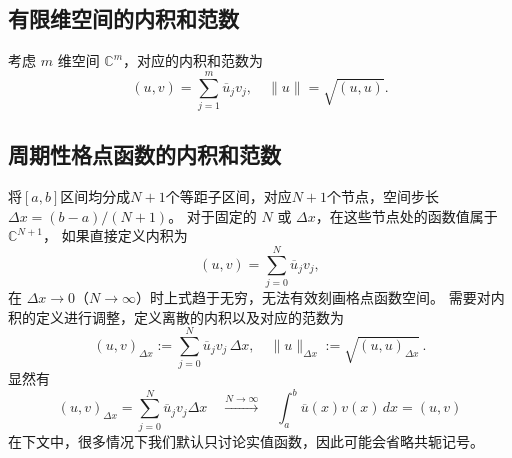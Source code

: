 \subsection*{有限维空间的内积和范数}

考虑 $m$ 维空间 $\mathbb{C}^m$，对应的内积和范数为
\[
    (u,v) = \sum_{j=1}^m \overline{u}_j v_j,\quad \|u\| = \sqrt{(u,u)}.
\]

\subsection*{周期性格点函数的内积和范数}

将$[a,b]$区间均分成$N+1$个等距子区间，对应$N+1$个节点，空间步长 $\Delta x = (b-a)/(N+1)$。
对于固定的 $N$ 或 $\Delta x$，在这些节点处的函数值属于 $\mathbb{C}^{N+1}$，
如果直接定义内积为
\[
    (u,v) = \sum_{j=0}^N \overline{u}_j v_j,
\]
在 $\Delta x \to 0$（$N \to \infty$）时上式趋于无穷，无法有效刻画格点函数空间。
需要对内积的定义进行调整，定义离散的内积以及对应的范数为
\[
    (u,v)_{\Delta x} := \sum_{j=0}^N \overline{u}_j v_j \,\Delta x,
    \quad \|u\|_{\Delta x} := \sqrt{(u,u)_{\Delta x}}\,.
\]
显然有
\[
    (u,v)_{\Delta x} = \sum_{j=0}^N \overline{u}_j v_j \Delta x
    \quad \xrightarrow{N \to \infty} \quad
    \int_a^b \overline{u}(x) v(x)\,dx = (u,v)
\]
在下文中，很多情况下我们默认只讨论实值函数，因此可能会省略共轭记号。
